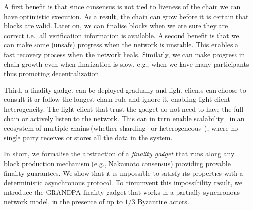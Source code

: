 \documentclass{article}
\begin{document}

A first benefit is that since consensus is not tied to liveness of the chain we can have optimistic execution.  As a result, the chain can grow before it is certain that blocks are valid. Later on, we can finalise blocks when we are sure they are correct i.e., all verification information is available. 
A second benefit is that we can make some (unsafe) progress when the network is unstable. This enables a fast recovery process when the network heals. Similarly, we can make progress in chain growth even when finalization is slow, e.g., when we have many participants thus promoting decentralization. 



Third, a finality gadget can be deployed gradually and light clients can choose to consult it or follow the longest chain rule and ignore it, enabling light client heterogeneity. 
The light client that trust the gadget do not need to have the full chain or actively listen to the network. 
This can in turn enable scalability~\cite{avarikioti19divide} in an ecosystem of multiple chains (whether sharding~\cite{kokoris17omniledger,al18chainspace,androulaki18channels} or heterogeneous~\cite{zamyatin19sok}), where no single party receives or stores all the data in the system. 


In short, we formalise the abstraction of a \emph{finality gadget} that runs along any block production mechanism (e.g., Nakamoto consensus) providing provable finality guarantees. We show that it is impossible to satisfy its properties with a deterministic asynchronous protocol. To circumvent this impossibility result, we introduce the GRANDPA finality gadget that works in a partially synchronous network model, in the presence of up to $1/3$ Byzantine actors. 
 
\end{document}
